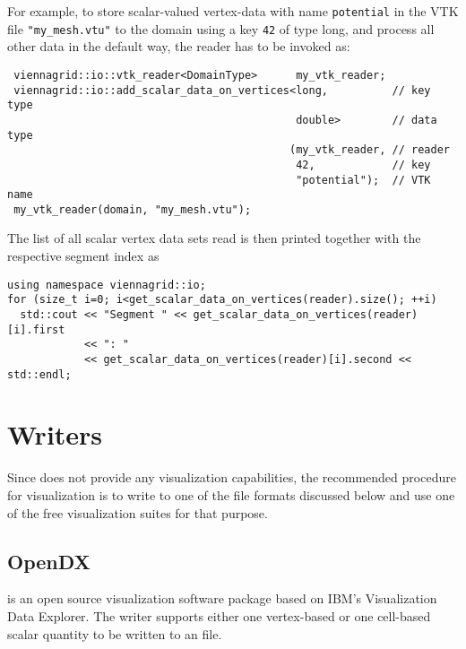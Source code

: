  For example, to store scalar-valued vertex-data with name \texttt{potential} in the VTK file \lstinline|"my_mesh.vtu"| to the domain using a key \lstinline|42| of type long, and process all other data in the default way, the reader has to be invoked as:
 \begin{lstlisting}
 viennagrid::io::vtk_reader<DomainType>      my_vtk_reader;
 viennagrid::io::add_scalar_data_on_vertices<long,          // key type
                                             double>        // data type
                                            (my_vtk_reader, // reader
                                             42,            // key
                                             "potential");  // VTK name
 my_vtk_reader(domain, "my_mesh.vtu");
 \end{lstlisting}
 The list of all scalar vertex data sets read is then printed together with the respective segment index as
 \begin{lstlisting}
using namespace viennagrid::io;
for (size_t i=0; i<get_scalar_data_on_vertices(reader).size(); ++i)
  std::cout << "Segment " << get_scalar_data_on_vertices(reader)[i].first 
            << ": "
            << get_scalar_data_on_vertices(reader)[i].second << std::endl;
 \end{lstlisting}
 

\section{Writers}
Since {\ViennaGrid} does not provide any visualization capabilities, the recommended procedure for visualization is 
to write to one of the file formats discussed below and use one of the free visualization suites for that purpose.


 \subsection{OpenDX}
 {\OpenDX} \cite{opendx} is an open source visualization software package based on IBM's Visualization Data Explorer.
 The writer supports either one vertex-based or one cell-based scalar quantity to be written to an {\OpenDX} file.

